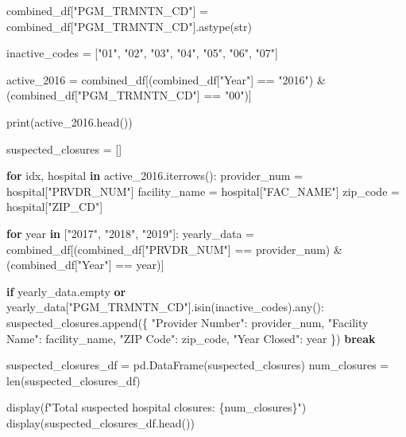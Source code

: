 \documentclass[
  letterpaper,
  DIV=11,
  numbers=noendperiod]{scrartcl}
\newenvironment{Shaded}{\begin{snugshade}}{\end{snugshade}}
\newcommand{\BuiltInTok}[1]{\textcolor[rgb]{0.00,0.23,0.31}{#1}}
\newcommand{\ControlFlowTok}[1]{\textcolor[rgb]{0.00,0.23,0.31}{\textbf{#1}}}
\newcommand{\KeywordTok}[1]{\textcolor[rgb]{0.00,0.23,0.31}{\textbf{#1}}}
\newcommand{\NormalTok}[1]{\textcolor[rgb]{0.00,0.23,0.31}{#1}}
\newcommand{\OperatorTok}[1]{\textcolor[rgb]{0.37,0.37,0.37}{#1}}
\newcommand{\SpecialCharTok}[1]{\textcolor[rgb]{0.37,0.37,0.37}{#1}}
\newcommand{\SpecialStringTok}[1]{\textcolor[rgb]{0.13,0.47,0.30}{#1}}
\newcommand{\StringTok}[1]{\textcolor[rgb]{0.13,0.47,0.30}{#1}}
\begin{document}
\begin{Shaded}
\begin{Highlighting}[]
\NormalTok{combined\_df[}\StringTok{"PGM\_TRMNTN\_CD"}\NormalTok{] }\OperatorTok{=}\NormalTok{ combined\_df[}\StringTok{"PGM\_TRMNTN\_CD"}\NormalTok{].astype(}\BuiltInTok{str}\NormalTok{)}

\NormalTok{inactive\_codes }\OperatorTok{=}\NormalTok{ [}\StringTok{"01"}\NormalTok{, }\StringTok{"02"}\NormalTok{, }\StringTok{"03"}\NormalTok{, }\StringTok{"04"}\NormalTok{, }\StringTok{"05"}\NormalTok{, }\StringTok{"06"}\NormalTok{, }\StringTok{"07"}\NormalTok{]}

\NormalTok{active\_2016 }\OperatorTok{=}\NormalTok{ combined\_df[(combined\_df[}\StringTok{"Year"}\NormalTok{] }\OperatorTok{==} \StringTok{"2016"}\NormalTok{) }\OperatorTok{\&}\NormalTok{ (combined\_df[}\StringTok{"PGM\_TRMNTN\_CD"}\NormalTok{] }\OperatorTok{==} \StringTok{"00"}\NormalTok{)]}

\BuiltInTok{print}\NormalTok{(active\_2016.head())}

\NormalTok{suspected\_closures }\OperatorTok{=}\NormalTok{ []}

\ControlFlowTok{for}\NormalTok{ idx, hospital }\KeywordTok{in}\NormalTok{ active\_2016.iterrows():}
\NormalTok{    provider\_num }\OperatorTok{=}\NormalTok{ hospital[}\StringTok{"PRVDR\_NUM"}\NormalTok{]}
\NormalTok{    facility\_name }\OperatorTok{=}\NormalTok{ hospital[}\StringTok{"FAC\_NAME"}\NormalTok{]}
\NormalTok{    zip\_code }\OperatorTok{=}\NormalTok{ hospital[}\StringTok{"ZIP\_CD"}\NormalTok{]}
    
    \ControlFlowTok{for}\NormalTok{ year }\KeywordTok{in}\NormalTok{ [}\StringTok{"2017"}\NormalTok{, }\StringTok{"2018"}\NormalTok{, }\StringTok{"2019"}\NormalTok{]:}
\NormalTok{        yearly\_data }\OperatorTok{=}\NormalTok{ combined\_df[(combined\_df[}\StringTok{"PRVDR\_NUM"}\NormalTok{] }\OperatorTok{==}\NormalTok{ provider\_num) }\OperatorTok{\&}\NormalTok{ (combined\_df[}\StringTok{"Year"}\NormalTok{] }\OperatorTok{==}\NormalTok{ year)]}
        
        \ControlFlowTok{if}\NormalTok{ yearly\_data.empty }\KeywordTok{or}\NormalTok{ yearly\_data[}\StringTok{"PGM\_TRMNTN\_CD"}\NormalTok{].isin(inactive\_codes).}\BuiltInTok{any}\NormalTok{():}
\NormalTok{            suspected\_closures.append(\{}
                \StringTok{"Provider Number"}\NormalTok{: provider\_num,}
                \StringTok{"Facility Name"}\NormalTok{: facility\_name,}
                \StringTok{"ZIP Code"}\NormalTok{: zip\_code,}
                \StringTok{"Year Closed"}\NormalTok{: year}
\NormalTok{            \})}
            \ControlFlowTok{break}  

\NormalTok{suspected\_closures\_df }\OperatorTok{=}\NormalTok{ pd.DataFrame(suspected\_closures)}
\NormalTok{num\_closures }\OperatorTok{=} \BuiltInTok{len}\NormalTok{(suspected\_closures\_df)}

\NormalTok{display(}\SpecialStringTok{f"Total suspected hospital closures: }\SpecialCharTok{\{}\NormalTok{num\_closures}\SpecialCharTok{\}}\SpecialStringTok{"}\NormalTok{)}
\NormalTok{display(suspected\_closures\_df.head()) }
\end{Highlighting}
\end{Shaded}
\end{document}
